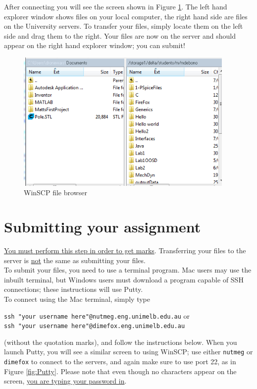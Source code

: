 \documentclass[]{article}
\begin{document}
After connecting you will see the screen shown in Figure \ref{fig:WinSCPFiles}. The left hand explorer window shows files on your local computer, the right hand side are files on the University servers. To transfer your files, simply locate them on the left side and drag them to the right. Your files are now on the server and should appear on the right hand explorer window; you can submit!

\begin{figure}[!h]
	\centering
	\includegraphics[width=300pt]{Images/WinSCPFiles}
	\caption{WinSCP file browser}
	\label{fig:WinSCPFiles}
\end{figure}

\section{Submitting your assignment}
\label{sec3}
\underline{You must perform this step in order to get marks}. Transferring your files to the server is \underline{not} the same as submitting your files.\\

To submit your files, you need to use a terminal program. Mac users may use the inbuilt terminal, but Windows users must download a program capable of SSH connections; these instructions will use Putty.\\

To connect using the Mac terminal, simply type
\begin{center}
\verb'ssh "your username here"@nutmeg.eng.unimelb.edu.au' or\\
\verb'ssh "your username here"@dimefox.eng.unimelb.edu.au'\\
\end{center}
(without the quotation marks), and follow the instructions below. When you launch Putty, you will see a similar screen to using WinSCP; use either \verb'nutmeg' or \verb'dimefox' to connect to the servers, and again make sure to use port 22, as in Figure \ref{fig:Putty}. Please note that even though no characters appear on the screen, \underline{you are typing your password in}.\\
\end{document}
